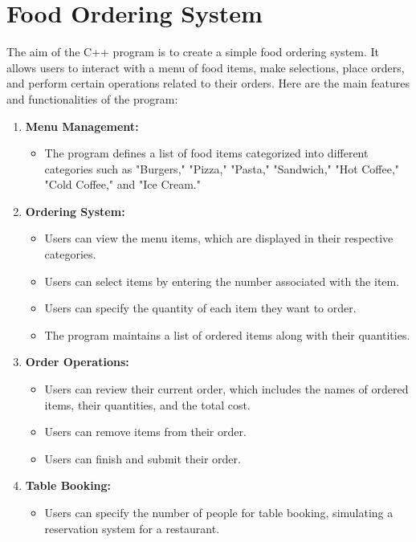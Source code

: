 \documentclass{article}
\begin{document}
\section{Food Ordering System}

The aim of the C++ program is to create a simple food ordering system. It allows users to interact with a menu of food items, make selections, place orders, and perform certain operations related to their orders. Here are the main features and functionalities of the program:

\begin{enumerate}[label=\arabic*.]
    \item \textbf{Menu Management:}
    \begin{itemize}
        \item The program defines a list of food items categorized into different categories such as "Burgers," "Pizza," "Pasta," "Sandwich," "Hot Coffee," "Cold Coffee," and "Ice Cream."
    \end{itemize}
    
    \item \textbf{Ordering System:}
    \begin{itemize}
        \item Users can view the menu items, which are displayed in their respective categories.
        \item Users can select items by entering the number associated with the item.
        \item Users can specify the quantity of each item they want to order.
        \item The program maintains a list of ordered items along with their quantities.
    \end{itemize}
    
    \item \textbf{Order Operations:}
    \begin{itemize}
        \item Users can review their current order, which includes the names of ordered items, their quantities, and the total cost.
        \item Users can remove items from their order.
        \item Users can finish and submit their order.
    \end{itemize}
    
    \item \textbf{Table Booking:}
    \begin{itemize}
        \item Users can specify the number of people for table booking, simulating a reservation system for a restaurant.
    \end{itemize}
    

\end{enumerate}
\end{document}
